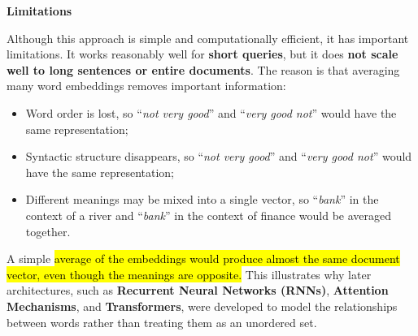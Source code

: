 \highspace
\begin{flushleft}
    \textcolor{Red2}{ \textbf{Limitations}}
\end{flushleft}
Although this approach is simple and computationally efficient, it has important limitations. It works reasonably well for \textbf{short queries}, but it does \textbf{not scale well to long sentences or entire documents}. The reason is that averaging many word embeddings removes important information:
\begin{itemize}
    \item Word order is lost, so ``\emph{not very good}'' and ``\emph{very good not}'' would have the same representation;
    \item Syntactic structure disappears, so ``\emph{not very good}'' and ``\emph{very good not}'' would have the same representation;
    \item Different meanings may be mixed into a single vector, so ``\emph{bank}'' in the context of a river and ``\emph{bank}'' in the context of finance would be averaged together.
\end{itemize}
A simple \hl{average of the embeddings would produce almost the same document vector, even though the meanings are opposite.} This illustrates why later architectures, such as \textbf{Recurrent Neural Networks (RNNs)}, \textbf{Attention Mechanisms}, and \textbf{Transformers}, were developed to model the relationships between words rather than treating them as an unordered set.